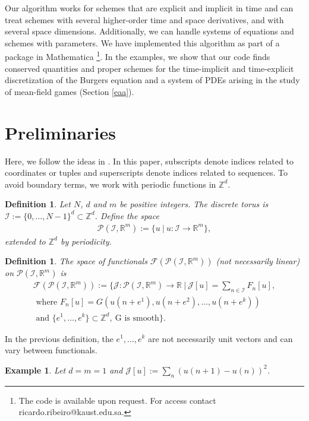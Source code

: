\documentclass[manuscript]{acmart}
\newcommand{\Rr}{{\mathbb{R}}}
\newcommand{\Zz}{{\mathbb{Z}}}
\newcommand{\1}{{\chi}}
\newcommand{\Ii}{{\mathcal{I}}}
\numberwithin{equation}{section}
\theoremstyle{thmlemcorr}
\numberwithin{theorem}{section}
\theoremstyle{thmlemcorr*}
\theoremstyle{defi}
\newtheorem{definition}[theorem]{Definition}
\theoremstyle{remexample}
\newtheorem{example}[theorem]{Example}
\theoremstyle{ass}
\begin{document}
Our algorithm works for schemes that are explicit and implicit in time and can treat schemes with several higher-order time  and space derivatives, and with several space dimensions.
Additionally, we can handle systems of equations and schemes with parameters. 
We have implemented this algorithm as part of a package in {\sc Mathematica} \cite{wolfram21} \footnote{The code is available upon request. For access contact ricardo.ribeiro@kaust.edu.sa.}.
In the examples, we show that our code finds conserved quantities and proper schemes for the time-implicit and time-explicit discretization of the Burgers equation and a system of PDEs arising in the study of mean-field games (Section \ref{eaa}).

\section{Preliminaries}
\label{assp}
Here, we follow the ideas in \cite{gomes20}.
In this paper, subscripts denote indices related to coordinates or tuples and superscripts denote indices related to sequences.
To avoid boundary terms, we work with periodic functions in $\Zz^d$.
\begin{definition}
	Let $N$, $d$ and $m$ be positive integers. The \emph{discrete torus} is $\Ii:=\{0,\ldots,N-1\}^d\subset \Zz^d$. Define the space
	\begin{gather*}
		\mathcal{P}(\Ii,\Rr^m):=\{u\ |\ u:\Ii\rightarrow\Rr^m\},
	\end{gather*}
	extended to $\Zz^d$ by periodicity.
\end{definition}
\begin{definition}
	The space of functionals $\mathcal{F}(\mathcal{P}(\Ii,\Rr^m))$ (not necessarily linear) on $\mathcal{P}(\Ii,\Rr^m)$ is
\begin{gather*}
	\mathcal{F}(\mathcal{P}(\Ii,\Rr^m)):= \Bigg\{\mathcal{J}:\mathcal{P}(\Ii,\Rr^m)\to \Rr\ \Bigg|\ \mathcal{J}[u]=\sum_{n\in\Ii}F_n[u],\\
	\text{ where }
	F_n[u]=G(u(n+e^1),u(n+e^2),\ldots,u(n+e^k))\\
	\text{ and }\{e^1,\ldots,e^k\}\subset\Zz^d,\ \text{G is smooth}
		\Bigg\}.
\end{gather*}
\end{definition}
In the previous definition, the $e^1,\ldots,e^k$ are not necessarily unit vectors and can vary between functionals.
\begin{example}
	\label{functional1}
	Let $d=m=1$ and
	$	\mathcal{J}[u]:=\sum_{n}(u(n+1)-u(n))^2$.
\end{example}
\end{document}
